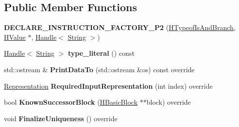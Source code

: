 \subsection*{Public Member Functions}
\begin{DoxyCompactItemize}
\item 
{\bfseries D\+E\+C\+L\+A\+R\+E\+\_\+\+I\+N\+S\+T\+R\+U\+C\+T\+I\+O\+N\+\_\+\+F\+A\+C\+T\+O\+R\+Y\+\_\+\+P2} (\hyperlink{classv8_1_1internal_1_1_h_typeof_is_and_branch}{H\+Typeof\+Is\+And\+Branch}, \hyperlink{classv8_1_1internal_1_1_h_value}{H\+Value} $\ast$, \hyperlink{classv8_1_1internal_1_1_handle}{Handle}$<$ \hyperlink{classv8_1_1internal_1_1_string}{String} $>$)\hypertarget{classv8_1_1internal_1_1_h_typeof_is_and_branch_a4e5db09c01fa80fdb9bcc749586f6540}{}\label{classv8_1_1internal_1_1_h_typeof_is_and_branch_a4e5db09c01fa80fdb9bcc749586f6540}

\item 
\hyperlink{classv8_1_1internal_1_1_handle}{Handle}$<$ \hyperlink{classv8_1_1internal_1_1_string}{String} $>$ {\bfseries type\+\_\+literal} () const \hypertarget{classv8_1_1internal_1_1_h_typeof_is_and_branch_a25d60db6f6590f8c0782ad00b22582d9}{}\label{classv8_1_1internal_1_1_h_typeof_is_and_branch_a25d60db6f6590f8c0782ad00b22582d9}

\item 
std\+::ostream \& {\bfseries Print\+Data\+To} (std\+::ostream \&os) const  override\hypertarget{classv8_1_1internal_1_1_h_typeof_is_and_branch_af8776c62a456ca1d9a25b36e7b40fbca}{}\label{classv8_1_1internal_1_1_h_typeof_is_and_branch_af8776c62a456ca1d9a25b36e7b40fbca}

\item 
\hyperlink{classv8_1_1internal_1_1_representation}{Representation} {\bfseries Required\+Input\+Representation} (int index) override\hypertarget{classv8_1_1internal_1_1_h_typeof_is_and_branch_aab67490d657fe6541c01c2f1b834e1fc}{}\label{classv8_1_1internal_1_1_h_typeof_is_and_branch_aab67490d657fe6541c01c2f1b834e1fc}

\item 
bool {\bfseries Known\+Successor\+Block} (\hyperlink{classv8_1_1internal_1_1_h_basic_block}{H\+Basic\+Block} $\ast$$\ast$block) override\hypertarget{classv8_1_1internal_1_1_h_typeof_is_and_branch_a5bafa0651615b2bf2e5d6667080801e5}{}\label{classv8_1_1internal_1_1_h_typeof_is_and_branch_a5bafa0651615b2bf2e5d6667080801e5}

\item 
void {\bfseries Finalize\+Uniqueness} () override\hypertarget{classv8_1_1internal_1_1_h_typeof_is_and_branch_a41708438d9f5e919f1e2a5dab0d09968}{}\label{classv8_1_1internal_1_1_h_typeof_is_and_branch_a41708438d9f5e919f1e2a5dab0d09968}

\end{DoxyCompactItemize}

